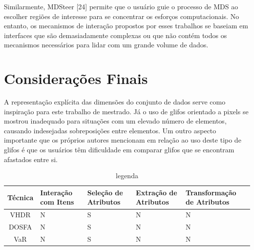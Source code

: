 Similarmente, MDSteer [24] permite que o usuário guie o processo de MDS ao escolher regiões de interesse para se concentrar os esforços computacionais. No entanto, os mecanismos de interação propostos por esses trabalhos se baseiam em interfaces que são demasiadamente complexas ou que não contém todos os mecanismos necessários para lidar com um grande volume de dados.

\section{Considerações Finais}

A representação explícita das dimensões do conjunto de dados serve como inspiração para este trabalho de mestrado. Já o uso de glifos orientado a pixels se mostrou inadequado para situações com um elevado número de elementos, causando indesejadas sobreposições entre elementos. Um outro aspecto importante que os próprios autores mencionam em relação ao uso deste tipo de  glifos é que os usuários têm dificuldade em comparar glifos que se encontram afastados entre si. 

\begin{table}
    \centering
    \caption {legenda}
    \begin{tabular}{|c|C{2cm}|C{2cm}|C{2.5cm}|C{3cm}|}
        \hline
        \textbf{Técnica} & 
        \textbf{Interação com Itens} & 
        \textbf{Seleção de Atributos} &
        \textbf{Extração de Atributos} &
        \textbf{Transformação de Atributos}
        \\ \hline
        VHDR    & N & S & N & N \\
        DOSFA   & N & S & N & N \\
        VaR     & N & S & N & N \\
        \hline
    \end{tabular}
\end{table}




